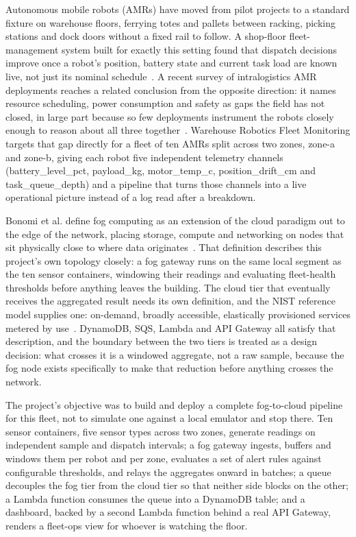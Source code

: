 \documentclass[conference]{IEEEtran}
\begin{document}
Autonomous mobile robots (AMRs) have moved from pilot projects to a standard fixture on warehouse floors, ferrying totes and pallets between racking, picking stations and dock doors without a fixed rail to follow. A shop-floor fleet-management system built for exactly this setting found that dispatch decisions improve once a robot's position, battery state and current task load are known live, not just its nominal schedule~\cite{ref1}. A recent survey of intralogistics AMR deployments reaches a related conclusion from the opposite direction: it names resource scheduling, power consumption and safety as gaps the field has not closed, in large part because so few deployments instrument the robots closely enough to reason about all three together~\cite{ref2}. Warehouse Robotics Fleet Monitoring targets that gap directly for a fleet of ten AMRs split across two zones, zone-a and zone-b, giving each robot five independent telemetry channels (battery\_level\_pct, payload\_kg, motor\_temp\_c, position\_drift\_cm and task\_queue\_depth) and a pipeline that turns those channels into a live operational picture instead of a log read after a breakdown.

Bonomi et al. define fog computing as an extension of the cloud paradigm out to the edge of the network, placing storage, compute and networking on nodes that sit physically close to where data originates~\cite{ref3}. That definition describes this project's own topology closely: a fog gateway runs on the same local segment as the ten sensor containers, windowing their readings and evaluating fleet-health thresholds before anything leaves the building. The cloud tier that eventually receives the aggregated result needs its own definition, and the NIST reference model supplies one: on-demand, broadly accessible, elastically provisioned services metered by use~\cite{ref4}. DynamoDB, SQS, Lambda and API Gateway all satisfy that description, and the boundary between the two tiers is treated as a design decision: what crosses it is a windowed aggregate, not a raw sample, because the fog node exists specifically to make that reduction before anything crosses the network.

The project's objective was to build and deploy a complete fog-to-cloud pipeline for this fleet, not to simulate one against a local emulator and stop there. Ten sensor containers, five sensor types across two zones, generate readings on independent sample and dispatch intervals; a fog gateway ingests, buffers and windows them per robot and per zone, evaluates a set of alert rules against configurable thresholds, and relays the aggregates onward in batches; a queue decouples the fog tier from the cloud tier so that neither side blocks on the other; a Lambda function consumes the queue into a DynamoDB table; and a dashboard, backed by a second Lambda function behind a real API Gateway, renders a fleet-ops view for whoever is watching the floor.
\end{document}
